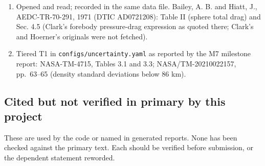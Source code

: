 \documentclass[
  a4paper,
  11pt]{article}
\newcommand{\tierok}{{\color{good}\ding{51}}}
\begin{document}
\begin{enumerate}
  not in the sourcing report's graded list. Van Dyke, M. D. and Gordon,
  H. D., \emph{Supersonic Flow Past a Family of Blunt Axisymmetric
  Bodies}, NASA TR R-1, 1959, Table III. NTRS 19980223623.
\item
  Opened and read; recorded in the same data file. Bailey, A. B. and
  Hiatt, J., AEDC-TR-70-291, 1971 (DTIC AD0721208): Table II (sphere
  total drag) and Sec. 4.5 (Clark's forebody pressure-drag expression as
  quoted there; Clark's and Hoerner's originals were not fetched).
\item
  Tiered \tierok{} T1 in \texttt{configs/\allowbreak{}uncertainty.yaml}
  as reported by the M7 milestone report: NASA-TM-4715, Tables 3.1 and
  3.3; NASA/TM-20210022157, pp.~63--65 (density standard deviations
  below 86 km).
\end{enumerate}

\subsection*{Cited but not verified in primary by this
project}\label{cited-but-not-verified-in-primary-by-this-project}

These are used by the code or named in generated reports. None has been
checked against the primary text. Each should be verified before
submission, or the dependent statement reworded.
\end{document}

